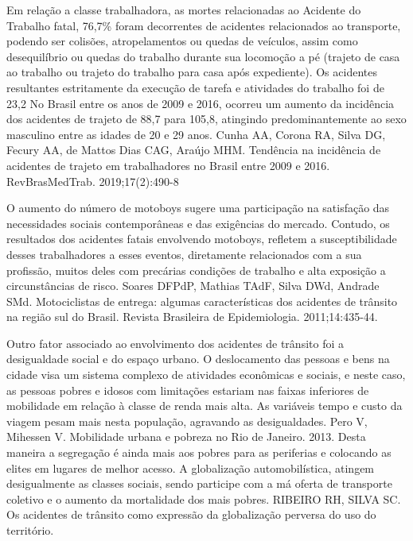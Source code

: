 Em relação a classe trabalhadora, as mortes relacionadas ao Acidente do Trabalho fatal, 76,7\% foram decorrentes de acidentes relacionados ao transporte, podendo ser colisões, atropelamentos ou quedas de veículos, assim como desequilíbrio ou quedas do trabalho durante sua locomoção a pé (trajeto de casa ao trabalho ou trajeto do trabalho para casa após expediente). Os acidentes resultantes estritamente da execução de tarefa e atividades do trabalho foi de 23,2%
No Brasil entre os anos de 2009 e 2016, ocorreu um aumento da incidência dos acidentes de trajeto de 88,7 para 105,8, atingindo predominantemente ao sexo masculino entre as idades de 20 e 29 anos. Cunha AA, Corona RA, Silva DG, Fecury AA, de Mattos Dias CAG, Araújo MHM. Tendência na incidência de acidentes de trajeto em trabalhadores no Brasil entre 2009 e 2016. RevBrasMedTrab. 2019;17(2):490-8

O aumento do número de motoboys sugere uma participação na satisfação das necessidades sociais contemporâneas e das exigências do mercado. Contudo, os resultados dos acidentes fatais envolvendo motoboys, refletem a susceptibilidade desses trabalhadores a esses eventos, diretamente relacionados com a sua profissão, muitos deles com precárias condições de trabalho e alta exposição a circunstâncias de risco. Soares DFPdP, Mathias TAdF, Silva DWd, Andrade SMd. Motociclistas de entrega: algumas características dos acidentes de trânsito na região sul do Brasil. Revista Brasileira de Epidemiologia. 2011;14:435-44. 

Outro fator associado ao envolvimento dos acidentes de trânsito foi a desigualdade social e do espaço urbano. O deslocamento das pessoas e bens na cidade visa um sistema complexo de atividades econômicas e sociais, e neste caso, as pessoas pobres e idosos com limitações estariam nas faixas inferiores de mobilidade em relação à classe de renda mais alta. As variáveis tempo e custo da viagem pesam mais nesta população, agravando as desigualdades. Pero V, Mihessen V. Mobilidade urbana e pobreza no Rio de Janeiro. 2013. Desta maneira a segregação é ainda mais  aos pobres para as periferias e colocando as elites em lugares de melhor acesso. A globalização automobilística, atingem desigualmente as classes sociais, sendo participe com a má oferta de transporte coletivo e o aumento da mortalidade dos mais pobres. RIBEIRO RH, SILVA SC. Os acidentes de trânsito como expressão da globalização perversa do uso do território. 
